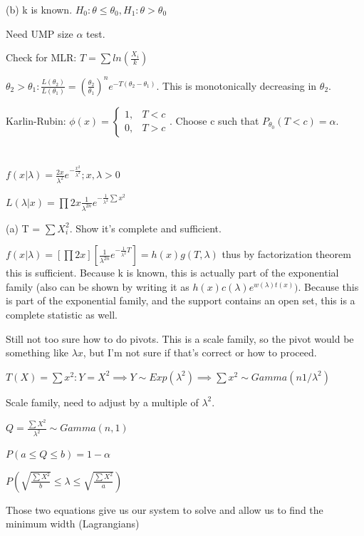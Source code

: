 \documentclass{article}
\let\Oldsum=\sum
\let\Oldprod=\prod
\renewcommand{\sum}{\Oldsum\limits}
\renewcommand{\prod}{\Oldprod\limits}
\begin{document}
(b) k is known. $H_0: \theta \le \theta_0, H_1: \theta > \theta_0$

Need UMP size $\alpha$ test. 

Check for MLR: $T = \sum ln(\frac{X_i}{k})$

$\theta_2 > \theta_1: \frac{L(\theta_2)}{L(\theta_1)} = (\frac{\theta_2}{\theta_1})^n e^{-T(\theta_2 - \theta_1)}$. This is monotonically decreasing in $\theta_2$.

Karlin-Rubin: $\phi(x) = \begin{cases} 1, & T < c \\ 0, & T > c \end{cases}$. Choose c such that $P_{\theta_0}(T < c) = \alpha$.

\section{}

$f(x|\lambda) = \frac{2x}{\lambda^2}e^{-\frac{x^2}{\lambda^2}}; x,\lambda >0$

$L(\lambda|x) = \prod 2x \frac{1}{\lambda^{2n}} e^{-\frac{1}{\lambda^2} \sum x^2}$

(a) T = $\sum X_i^2$. Show it's complete and sufficient. 

$f(x|\lambda) = [\prod 2x] [\frac{1}{\lambda^{2n}}e^{-\frac{1}{\lambda^2}T}] = h(x)g(T, \lambda)$ thus by factorization theorem this is sufficient. Because k is known, this is actually part of the exponential family (also can be shown by writing it as $h(x)c(\lambda)e^{w(\lambda)t(x)})$. Because this is part of the exponential family, and the support contains an open set, this is a complete statistic as well. 

Still not too sure how to do pivots. This is a scale family, so the pivot would be something like $\lambda x$, but I'm not sure if that's correct or how to proceed. 

$T(X) =\sum x^2: Y = X^2 \implies Y \sim Exp(\lambda^2) \implies \sum x^2 \sim Gamma(n 1/\lambda^2)$

Scale family, need to adjust by a multiple of $\lambda^2$.

$Q = \frac{\sum X^2}{\lambda^2} \sim Gamma(n, 1)$

$P(a \le Q \le b) = 1-\alpha$

$P(\sqrt{\frac{\sum X^2}{b}} \le \lambda \le \sqrt{\frac{\sum X^2}{a}})$

Those two equations give us our system to solve and allow us to find the minimum width (Lagrangians)
\end{document}
